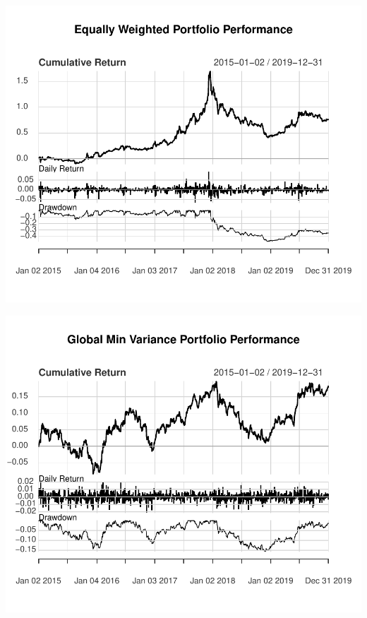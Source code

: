 \documentclass[11pt,preprint, authoryear]{elsarticle}
\numberwithin{equation}{section}
\numberwithin{figure}{section}
\numberwithin{table}{section}
\begin{document}
\includegraphics{FinMetrics-Essay_files/figure-latex/unnamed-chunk-25-1.pdf}

\includegraphics{FinMetrics-Essay_files/figure-latex/unnamed-chunk-27-1.pdf}
\end{document}
